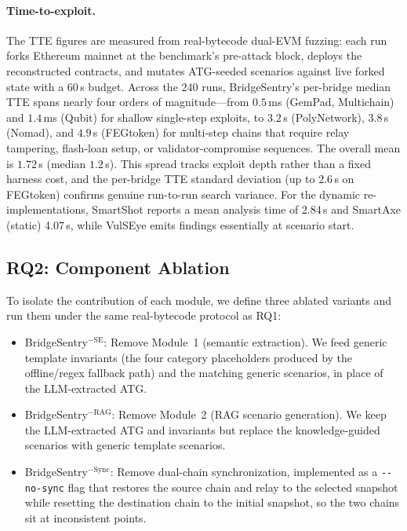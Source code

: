 \documentclass[journal]{IEEEtran}
\begin{document}
\paragraph{Time-to-exploit.}
The TTE figures are measured from real-bytecode dual-EVM fuzzing: each run forks Ethereum mainnet at the benchmark's pre-attack block, deploys the reconstructed contracts, and mutates ATG-seeded scenarios against live forked state with a 60\,s budget. Across the 240 runs, BridgeSentry's per-bridge median TTE spans nearly four orders of magnitude---from $0.5$\,ms (GemPad, Multichain) and $1.4$\,ms (Qubit) for shallow single-step exploits, to $3.2$\,s (PolyNetwork), $3.8$\,s (Nomad), and $4.9$\,s (FEGtoken) for multi-step chains that require relay tampering, flash-loan setup, or validator-compromise sequences. The overall mean is $1.72$\,s (median $1.2$\,s). This spread tracks exploit depth rather than a fixed harness cost, and the per-bridge TTE standard deviation (up to $2.6$\,s on FEGtoken) confirms genuine run-to-run search variance. For the dynamic re-implementations, SmartShot reports a mean analysis time of 2.84\,s and SmartAxe (static) 4.07\,s, while VulSEye emits findings essentially at scenario start.


\subsection{RQ2: Component Ablation}

To isolate the contribution of each module, we define three ablated variants and run them under the same real-bytecode protocol as RQ1:

\begin{itemize}
    \item BridgeSentry$^{-\text{SE}}$: Remove Module~1 (semantic extraction). We feed generic template invariants (the four category placeholders produced by the offline/regex fallback path) and the matching generic scenarios, in place of the LLM-extracted ATG.
    \item BridgeSentry$^{-\text{RAG}}$: Remove Module~2 (RAG scenario generation). We keep the LLM-extracted ATG and invariants but replace the knowledge-guided scenarios with generic template scenarios.
    \item BridgeSentry$^{-\text{Sync}}$: Remove dual-chain synchronization, implemented as a \texttt{-{}-no-sync} flag that restores the source chain and relay to the selected snapshot while resetting the destination chain to the initial snapshot, so the two chains sit at inconsistent points.
\end{itemize}
\end{document}
